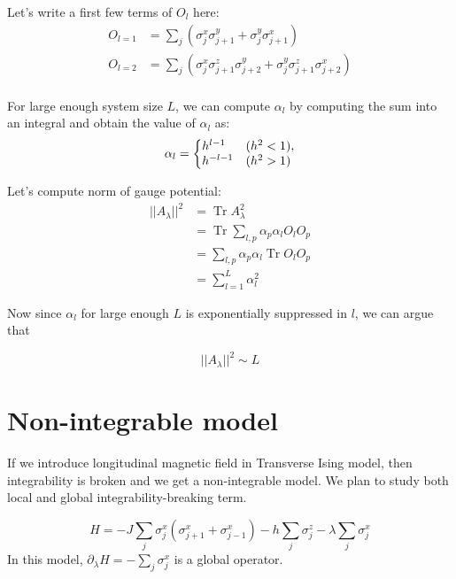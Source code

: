 \documentclass[11pt,a4paper]{article}
\DeclareMathOperator{\Tr}{Tr}
\begin{document}
Let's write a first few terms of $O_l$ here:
\begin{align*}
O_{l=1}&=  \sum_j ( \sigma_j^x  \sigma_{j+1}^y +  \sigma_j^y  \sigma_{j+1}^x) \\
O_{l=2} &=  \sum_j ( \sigma_j^x \sigma_{j+1}^z \sigma_{j+2}^y +  \sigma_j^y \sigma_{j+1}^z \sigma_{j+2}^x) \\
\end{align*}


For large enough system size $L$, we can compute $\alpha_l$ \cite{kolodrubetz2016geometry} by computing the sum into an integral and obtain the value of $\alpha_l$ as: 
\begin{equation}
 \alpha_l=\left\{
  \begin{array}{@{}ll@{}}
    h^{l-1} & (h^2 <1), \\
     h^{-l-1} & (h^2 >1)
  \end{array}\right.
\end{equation}



Let's compute norm of gauge potential:
\begin{align}
||A_{\lambda}||^2 &= \Tr  A_{\lambda}^2 \\
&= \Tr \sum_{l,p}  \alpha_p \alpha_l O_l  O_p\\
&=  \sum_{l,p}  \alpha_p \alpha_l  \Tr O_l  O_p\\
&=  \sum_{l=1}^{L}  \alpha_l ^2
\end{align}


Now since $\alpha_l$ for large enough $L$ is exponentially suppressed in $l$, we can argue that


\begin{equation}
\boxed{||A_{\lambda}||^2 \sim  L }
\end{equation}

\section{Non-integrable model}

If we introduce longitudinal magnetic field in Transverse Ising model, then integrability is broken and we get a non-integrable model. We plan to study both local  and global integrability-breaking term. 

\begin{equation}
H= -J \sum_{j} \sigma_j^x (\sigma_{j+1}^x+ \sigma_{j-1}^x) - h\sum_{j} \sigma_j^z -\lambda \sum_{j} \sigma_j^x 
\end{equation}
In this model, $\partial_{\lambda}H = - \sum_{j} \sigma_j^x  $ is a global operator.
\end{document}
